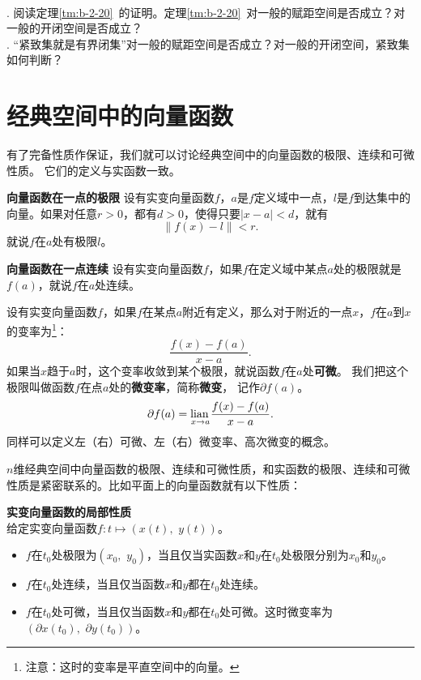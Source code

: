 \documentclass[12pt,UTF8,fontset=none]{ctexbook}
\begin{document}
\begin{appendix}
\begin{sk}
    \mbox{}\\
    . 阅读定理\ref{tm:b-2-20}~的证明。定理\ref{tm:b-2-20}~对一般的赋距空间是否成立？对一般的开闭空间是否成立？\\
    . “紧致集就是有界闭集”对一般的赋距空间是否成立？对一般的开闭空间，紧致集如何判断？
\end{sk}

\section{经典空间中的向量函数}
有了完备性质作保证，我们就可以讨论经典空间中的向量函数的极限、连续和可微性质。
它们的定义与实函数一致。
\begin{df}{\textbf{向量函数在一点的极限}}
    设有实变向量函数$f$，$a$是$f$定义域中一点，$l$是$f$到达集中的向量。如果对任意$r>0$，都有$d>0$，使得只要$|x - a| < d$，就有
    $$\left\|f(x) - l\right\| < r.$$
    就说$f$在$a$处有极限$l$。
\end{df}

\begin{df}{\textbf{向量函数在一点连续}}
    设有实变向量函数$f$，如果$f$在定义域中某点$a$处的极限就是$f(a)$，就说$f$在$a$处连续。
\end{df}

\begin{df}
    设有实变向量函数$f$，如果$f$在某点$a$附近有定义，那么对于附近的一点$x$，$f$在$a$到$x$的变率为\footnote{注意：这时的变率是平直空间中的向量。}：
    $$ \frac{f(x) - f(a)}{x - a}.$$
    如果当$x$趋于$a$时，这个变率收敛到某个极限，就说函数$f$在$a$处\textbf{可微}。
    我们把这个极限叫做函数$f$在点$a$处的\textbf{微变率}，简称\textbf{微变}，
    记作$\partial f(a)$。
    $$ \partial f(a) = \underset{{x\to a}}{\operatorname{lian}\,} \frac{f(x) - f(a)}{x - a}. $$
    同样可以定义左（右）可微、左（右）微变率、高次微变的概念。
\end{df}

$n$维经典空间中向量函数的极限、连续和可微性质，和实函数的极限、连续和可微性质是紧密联系的。比如平面上的向量函数就有以下性质：
\begin{tm}\label{tm:b-1-10}
    \textbf{实变向量函数的局部性质}\\
    给定实变向量函数$f: t\mapsto (x(t),\,\, y(t))$。
    \begin{itemize}
        \item $f$在$t_0$处极限为$(x_0,\,\,y_0)$，当且仅当实函数$x$和$y$在$t_0$处极限分别为$x_0$和$y_0$。
        \item $f$在$t_0$处连续，当且仅当函数$x$和$y$都在$t_0$处连续。
        \item $f$在$t_0$处可微，当且仅当函数$x$和$y$都在$t_0$处可微。这时微变率为$(\partial x(t_0),\,\,\partial y(t_0))$。
    \end{itemize}
\end{tm}


\end{appendix}
\end{document}
